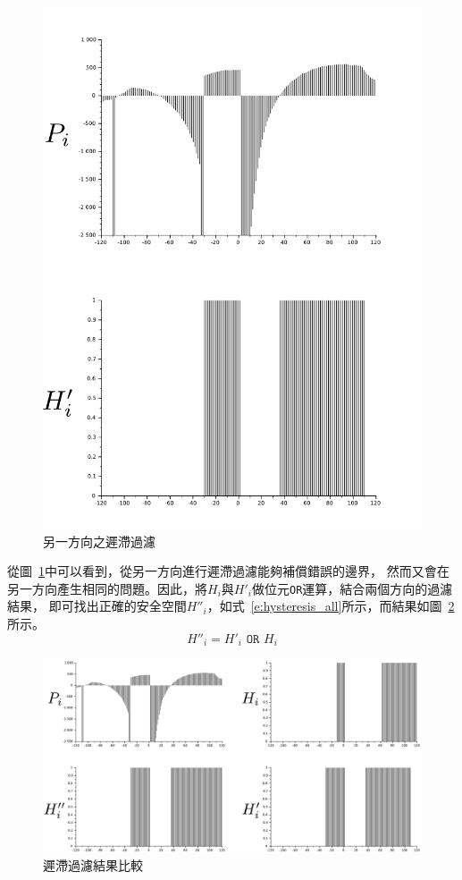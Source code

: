 \begin{figure}[h!]
	\centering
	\includegraphics[width=.5\textwidth]{figures/algorithm/hysteresis_error_hist_two}
	\caption{另一方向之遲滯過濾}
	\label{f:hysteresis_error_hist_two}
\end{figure}
從圖~\ref{f:hysteresis_error_hist_two}中可以看到，從另一方向進行遲滯過濾能夠補償錯誤的邊界，
然而又會在另一方向產生相同的問題。因此，將$H_i$與$H'_i$做位元\texttt{OR}運算，結合兩個方向的過濾結果，
即可找出正確的安全空間$H''_i$，如式~\ref{e:hysteresis_all}所示，而結果如圖~\ref{f:hysteresis_error_hist_all}所示。
\begin{equation}
	H''_i = H'_i \texttt{ OR } H_i
	\label{e:hysteresis_all}
\end{equation}
\begin{figure}[h!]
	\centering
	\includegraphics[width=\textwidth]{figures/algorithm/hysteresis_error_hist_all}
	\caption{遲滯過濾結果比較}
	\label{f:hysteresis_error_hist_all}
\end{figure}

